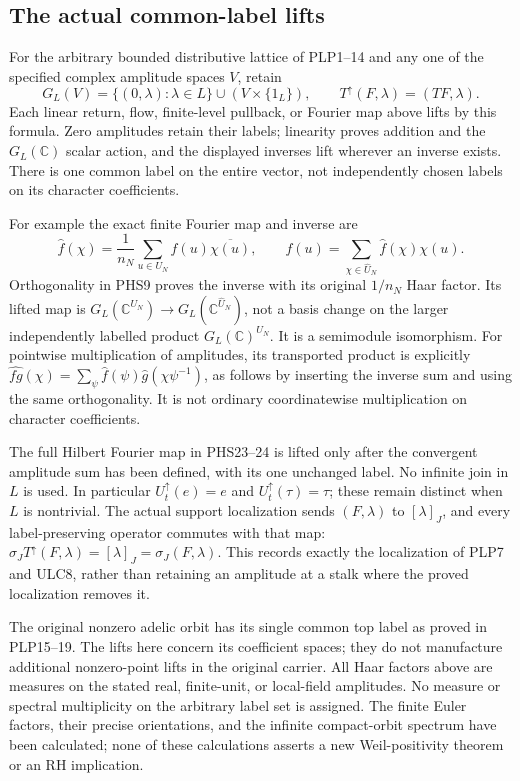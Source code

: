 \subsection{The actual common-label lifts}

For the arbitrary bounded distributive lattice of PLP1--14 and
any one of the specified complex amplitude spaces $V$, retain
\begin{equation}\tag{PHS27}
 G_L(V)=\{(0,\lambda):\lambda\in L\}\cup(V\times\{1_L\}),
 \qquad T^\uparrow(F,\lambda)=(TF,\lambda).
\end{equation}
Each linear return, flow, finite-level pullback, or Fourier map
above lifts by this formula. Zero amplitudes retain their labels;
linearity proves addition and the $G_L(\mathbb C)$ scalar action,
and the displayed inverses lift wherever an inverse exists.
There is one common label on the entire vector, not independently
chosen labels on its character coefficients.

For example the exact finite Fourier map and inverse are
\begin{equation}\tag{PHS28}
 \widehat f(\chi)=\frac1{n_N}\sum_{u\in U_N}
                         f(u)\overline{\chi(u)},\qquad
 f(u)=\sum_{\chi\in\widehat U_N}\widehat f(\chi)\chi(u).
\end{equation}
Orthogonality in PHS9 proves the inverse with its original
$1/n_N$ Haar factor. Its lifted map is
$G_L(\mathbb C^{U_N})\to G_L(\mathbb C^{\widehat U_N})$,
not a basis change on the larger independently labelled product
$G_L(\mathbb C)^{U_N}$. It is a semimodule isomorphism.
For pointwise multiplication of amplitudes, its transported
product is explicitly
$\widehat{fg}(\chi)=\sum_\psi\widehat f(\psi)
\widehat g(\chi\psi^{-1})$, as follows by inserting the inverse
sum and using the same orthogonality. It is not ordinary
coordinatewise multiplication on character coefficients.

The full Hilbert Fourier map in PHS23--24 is lifted only after
the convergent amplitude sum has been defined, with its one
unchanged label. No infinite join in $L$ is used. In particular
$U_t^\uparrow(e)=e$ and $U_t^\uparrow(\tau)=\tau$; these
remain distinct when $L$ is nontrivial. The actual support
localization sends $(F,\lambda)$ to $[\lambda]_J$, and every
label-preserving operator commutes with that map:
$\sigma_JT^\uparrow(F,\lambda)=[\lambda]_J
=\sigma_J(F,\lambda)$. This records exactly the localization
of PLP7 and ULC8, rather than retaining an amplitude at a stalk
where the proved localization removes it.

The original nonzero adelic orbit has its single common top label
as proved in PLP15--19. The lifts here concern its coefficient
spaces; they do not manufacture additional nonzero-point lifts
in the original carrier. All Haar factors above are measures on
the stated real, finite-unit, or local-field amplitudes. No
measure or spectral multiplicity on the arbitrary label set is
assigned. The finite Euler factors, their precise orientations,
and the infinite compact-orbit spectrum have been calculated;
none of these calculations asserts a new Weil-positivity theorem
or an RH implication.
